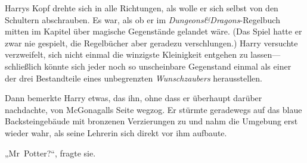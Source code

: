 Harrys Kopf drehte sich in alle Richtungen, als wolle er sich selbst von den Schultern abschrauben. Es war, als ob er im \emph{Dungeons\&Dragons}-Regelbuch mitten im Kapitel über magische Gegenstände gelandet wäre. (Das Spiel hatte er zwar nie gespielt, die Regelbücher aber geradezu verschlungen.) Harry versuchte verzweifelt, sich nicht einmal die winzigste Kleinigkeit entgehen zu lassen—schließlich könnte sich jeder noch so unscheinbare Gegenstand einmal als einer der drei Bestandteile eines unbegrenzten \emph{Wunschzaubers} herausstellen.

Dann bemerkte Harry etwas, das ihn, ohne dass er überhaupt darüber nachdachte, von McGonagalls Seite wegzog. Er stürmte geradewegs auf das blaue Backsteingebäude mit bronzenen Verzierungen zu und nahm die Umgebung erst wieder wahr, als seine Lehrerin sich direkt vor ihm aufbaute.

„Mr~Potter?“, fragte sie.

